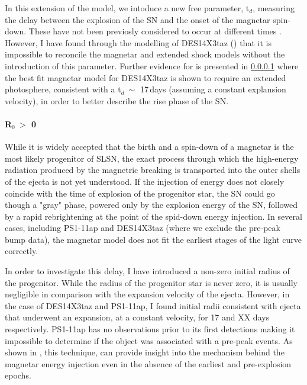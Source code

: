 In this extension of the model, we intoduce a new free parameter, t$_d$, measuring the delay between the explosion of the SN and the onset of the magnetar spin-down. These have not been previosly considered to occur at different times \citep{Nicoll2016}. However, I have found through the modelling of DES14X3taz () that it is impossible to reconcile the magnetar and extended shock models without the introduction of this parameter. Further evidence for is presented in \cref{par:R0nonzero} where the best fit magnetar model for DES14X3taz is shown to require an extended photosphere, consistent with a t$_d ~\sim$ 17\,days (assuming a constant explansion velocity), in order to better describe the rise phase of the SN.

\begin{figure}
  \caption{}
  \label{fig:PiroMagnetar}
\end{figure}

\paragraph{R$_0~>$ 0}
\label{par:R0nonzero}
While it is widely accepted that the birth and a spin-down of a magnetar is the most likely progenitor of SLSN, the exact process through which the high-energy radiation produced by the magnetric breaking is transported into the outer shells of the ejecta is not yet understood. If the injection of energy does not closely coincide with the time of explosion of the progenitor star, the SN could go though a "gray" phase, powered only by the explosion energy of the SN, followed by a rapid rebrightening at the point of the spid-down energy injection. In several cases, including PS1-11ap and DES14X3taz (where we exclude the pre-peak bump data), the magnetar model does not fit the earliest stages of the light curve correctly.

In order to investigate this delay, I have introduced a non-zero initial radius of the progenitor. While the radius of the progenitor star is never zero, it is usually negligible in comparison with the expansion velocity of the ejecta. However, in the case of DES14X3taz and PS1-11ap, I found initial radii consistent with ejecta that underwent an expansion, at a constant velocity, for 17 and XX days respectively. PS1-11ap has no observations prior to its first detections making it impossible to determine if the object was associated with a pre-peak events. As shown in , this technique, can provide insight into the mechanism behind the magnetar energy injection even in the absence of the earliest and pre-explosion epochs.


